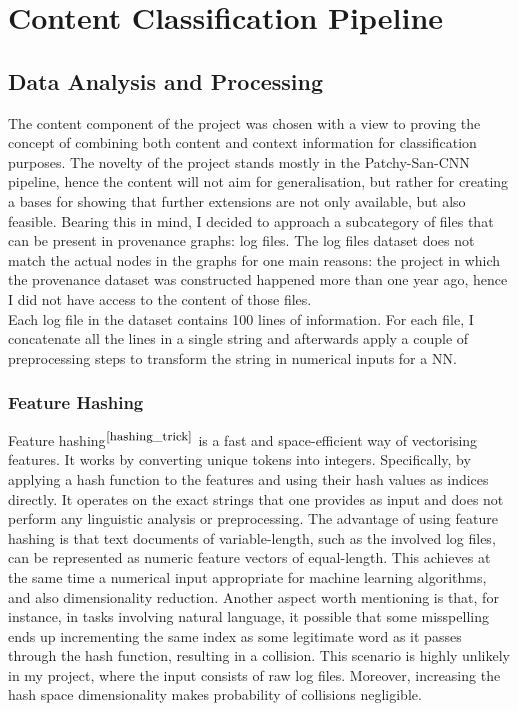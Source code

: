 \section{Content Classification Pipeline}
\subsection{Data Analysis and Processing}

The content component of the project was chosen with a view to proving the concept of combining both content and context information for classification purposes. The novelty of the project stands mostly in the Patchy-San-CNN pipeline, hence the content will not aim for generalisation, but rather for creating a bases for showing that further extensions are not only available, but also feasible. Bearing this in mind, I decided to approach a subcategory of files that can be present in provenance graphs: log files. The log files dataset does not match the actual nodes in the graphs for one main reasons: the project in which the provenance dataset was constructed happened more than one year ago, hence I did not have access to the content of those files. \\

Each log file in the dataset contains 100 lines of information. For each file, I concatenate all the lines in a single string and afterwards apply a couple of preprocessing steps to transform the string in numerical inputs for a NN. \\

\subsubsection*{Feature Hashing}

Feature hashing$^{\small \cite{hashing_trick}}$ is a fast and space-efficient way of vectorising features. It works by converting unique tokens into integers. Specifically, by applying a hash function to the features and using their hash values as indices directly. It operates on the exact strings that one provides as input and does not perform any linguistic analysis or preprocessing. The advantage of using feature hashing is that text documents of variable-length, such as the involved log files, can be represented as numeric feature vectors of equal-length. This achieves at the same time a numerical input appropriate for machine learning algorithms, and also dimensionality reduction. Another aspect worth mentioning is that, for instance, in tasks involving natural language, it possible that some misspelling ends up incrementing the same index as some legitimate word as it passes through the hash function, resulting in a collision. This scenario is highly unlikely in my project, where the input consists of raw log files. Moreover, increasing the hash space dimensionality makes probability of collisions negligible.\\

